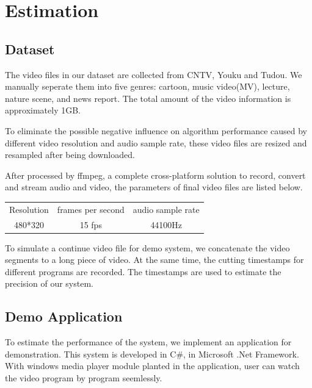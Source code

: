 \documentclass{article}
\begin{document}
\section{Estimation}

\subsection{Dataset}

  The video files in our dataset are collected from CNTV, Youku and Tudou. We manually seperate them into five genres: cartoon, music video(MV), lecture, nature scene, and news report. The total amount of the video information is approximately 1GB. 

  To eliminate the possible negative influence on algorithm performance caused by different video resolution and audio sample rate, these video files are resized and resampled after being downloaded. 

  After processed by ffmpeg, a complete cross-platform solution to record, convert and stream audio and video, the parameters of final video files are listed below.

  \begin{center}
  \begin{tabular}{ccc}
    \hline
    Resolution & frames per second & audio sample rate\\
    480*320 & 15 fps & 44100Hz\\
    \hline
  \end{tabular}
  \end{center}

  To simulate a continue video file for demo system, we concatenate the video segments to a long piece of video. At the same time, the cutting timestamps for different programs are recorded. The timestamps are used to estimate the precision of our system. 

\subsection{Demo Application}

  To estimate the performance of the system, we implement an application for demonstration. This system is developed in C\#, in Microsoft .Net Framework. With windows media player module planted in the application, user can watch the video program by program seemlessly.
\end{document}
